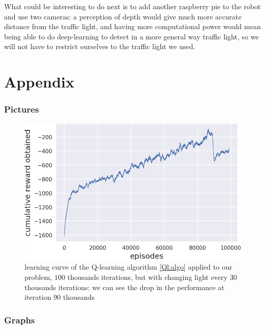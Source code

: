 \documentclass[14pt,a4paper]{article}
\theoremstyle{definition}
\begin{document}
What could be interesting to do next is to add another raspberry pie to the robot and use two cameras: a perception of depth would give much more accurate distance from the traffic light, and having more computational power would mean being able to do deep-learning to detect in a more general way traffic light, so we will not have to restrict ourselves to the traffic light we used.



\newpage
\part*{Appendix}
\appendix
\section{Pictures} \label{pictures}

\begin{figure}[h]
\centering
\captionsetup{justification=centering,margin=2cm}
\includegraphics[scale=0.6]{img/Q_learning_curve_random_light.png}
\caption{learning curve of the Q-learning algorithm \ref{Ql:algo} applied to our problem, $100$ thousands iterations, but with changing light every $30$ thousands iterations: we can see the drop in the performance at iteration $90$ thousands}
\label{curve_random}
\end{figure}


\section{Graphs} \label{GRAPHS}
\end{document}
